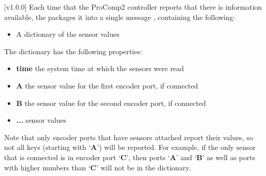 [v1.0.0]
Each time that the ProComp2 controller reports that there is information available,
the  packages it into a single message
\openSq{}\closeSq, containing the following:
\begin{itemize}
\item A dictionary \openSq{}\closeSq{} of the sensor values 
\end{itemize}

The dictionary has the following properties:
\begin{itemize}
\item\textbf{time} \longDash{} the system time at which the sensors were read
\item\exSp\textbf{A} \longDash{} the sensor value for the first encoder port, if
connected
\item\exSp\textbf{B} \longDash{} the sensor value for the second encoder port, if
connected
\item\exSp\textbf{...} \longDash{} sensor values
\end{itemize}
Note that only encoder ports that have sensors attached report their values, so not all
keys (starting with `\textbf{A}') will be reported.
For example, if the only sensor that is connected is in encoder port `\textbf{C}', then
ports `\textbf{A}' and `\textbf{B}' as well as ports with higher numbers than `\textbf{C}'
will not be in the dictionary.
\appendixEnd{}
